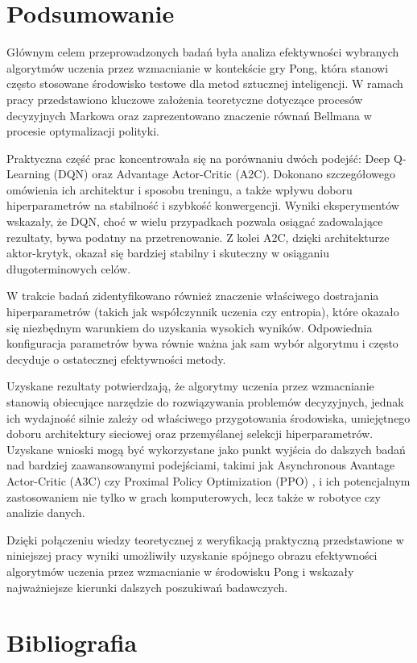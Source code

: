\documentclass[a4paper, 12pt]{article}
\numberwithin{equation}{section}
\begin{document}
    \section{Podsumowanie}
    Głównym celem przeprowadzonych badań była analiza efektywności wybranych algorytmów uczenia przez wzmacnianie w kontekście gry Pong, która stanowi często stosowane środowisko testowe dla metod sztucznej inteligencji. W ramach pracy przedstawiono kluczowe założenia teoretyczne dotyczące procesów decyzyjnych Markowa oraz zaprezentowano znaczenie równań Bellmana w procesie optymalizacji polityki.

    Praktyczna część prac koncentrowała się na porównaniu dwóch podejść: Deep Q-Learning (DQN) oraz Advantage Actor-Critic (A2C). Dokonano szczegółowego omówienia ich architektur i sposobu treningu, a także wpływu doboru hiperparametrów na stabilność i szybkość konwergencji. Wyniki eksperymentów wskazały, że DQN, choć w wielu przypadkach pozwala osiągać zadowalające rezultaty, bywa podatny na przetrenowanie. Z kolei A2C, dzięki architekturze aktor-krytyk, okazał się bardziej stabilny i skuteczny w osiąganiu długoterminowych celów.

    W trakcie badań zidentyfikowano również znaczenie właściwego dostrajania hiperparametrów (takich jak współczynnik uczenia czy entropia), które okazało się niezbędnym warunkiem do uzyskania wysokich wyników. Odpowiednia konfiguracja parametrów bywa równie ważna jak sam wybór algorytmu i często decyduje o ostatecznej efektywności metody.

    Uzyskane rezultaty potwierdzają, że algorytmy uczenia przez wzmacnianie stanowią obiecujące narzędzie do rozwiązywania problemów decyzyjnych, jednak ich wydajność silnie zależy od właściwego przygotowania środowiska, umiejętnego doboru architektury sieciowej oraz przemyślanej selekcji hiperparametrów. Uzyskane wnioski mogą być wykorzystane jako punkt wyjścia do dalszych badań nad bardziej zaawansowanymi podejściami, takimi jak Asynchronous Avantage Actor-Critic (A3C) \cite{mnih2016a3c} czy Proximal Policy Optimization (PPO) \cite{schulman2017proximal}, i ich potencjalnym zastosowaniem nie tylko w grach komputerowych, lecz także w robotyce czy analizie danych.

    Dzięki połączeniu wiedzy teoretycznej z weryfikacją praktyczną przedstawione w niniejszej pracy wyniki umożliwiły uzyskanie spójnego obrazu efektywności algorytmów uczenia przez wzmacnianie w środowisku Pong i wskazały najważniejsze kierunki dalszych poszukiwań badawczych.
    \section{Bibliografia}
    \printbibliography
\end{document}
